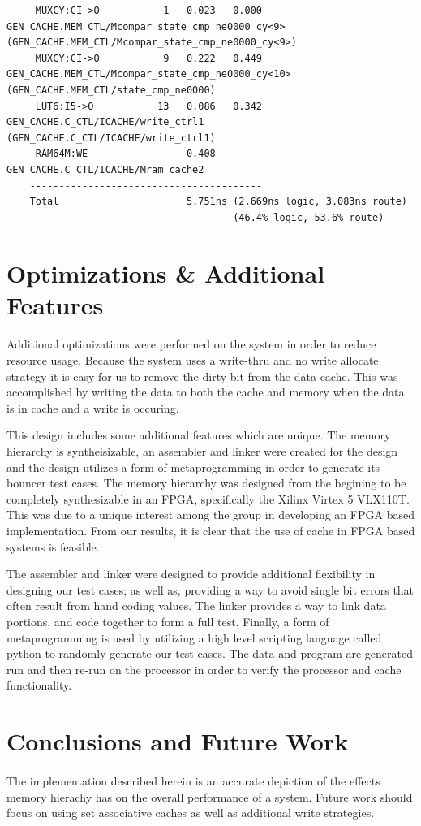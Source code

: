 \documentclass[11pt,letterpaper,]{article}
\begin{document}
\begin{tiny}
\begin{verbatim}
     MUXCY:CI->O           1   0.023   0.000  GEN_CACHE.MEM_CTL/Mcompar_state_cmp_ne0000_cy<9> (GEN_CACHE.MEM_CTL/Mcompar_state_cmp_ne0000_cy<9>)
     MUXCY:CI->O           9   0.222   0.449  GEN_CACHE.MEM_CTL/Mcompar_state_cmp_ne0000_cy<10> (GEN_CACHE.MEM_CTL/state_cmp_ne0000)
     LUT6:I5->O           13   0.086   0.342  GEN_CACHE.C_CTL/ICACHE/write_ctrl1 (GEN_CACHE.C_CTL/ICACHE/write_ctrl1)
     RAM64M:WE                 0.408          GEN_CACHE.C_CTL/ICACHE/Mram_cache2
    ----------------------------------------
    Total                      5.751ns (2.669ns logic, 3.083ns route)
                                       (46.4% logic, 53.6% route)
\end{verbatim}
\end{tiny}

\section{ Optimizations \& Additional Features }
\paragraph{}
Additional optimizations were performed on the system in order to reduce resource usage.  Because the system uses a write-thru and no write allocate strategy it is easy for us to remove the dirty bit from the data cache.  This was accomplished by writing the data to both the cache and memory when the data is in cache and a write is occuring.

This design includes some additional features which are unique.  The memory hierarchy is syntheisizable, an assembler and linker were created for the design and the design utilizes a form of metaprogramming in order to generate its bouncer test cases.  The memory hierarchy was designed from the begining to be completely synthesizable in an FPGA, specifically the Xilinx Virtex 5 VLX110T.  This was due to a unique interest among the group in developing an FPGA based implementation.  From our results, it is clear that the use of cache in FPGA based systems is feasible. 

The assembler and linker were designed to provide additional flexibility in designing our test cases; as well as, providing a way to avoid single bit errors that often result from hand coding values.  The linker provides a way to link data portions, and code together to form a full test. Finally, a form of metaprogramming is used by utilizing a high level scripting language called python to randomly generate our test cases.  The data and program are generated run and then re-run on the processor in order to verify the processor and cache functionality.

\section{ Conclusions and Future Work }
\paragraph{}
The implementation described herein is an accurate depiction of the effects memory hierachy has on the overall performance of a system.  Future work should focus on using set associative caches as well as additional write strategies.
\end{document}
